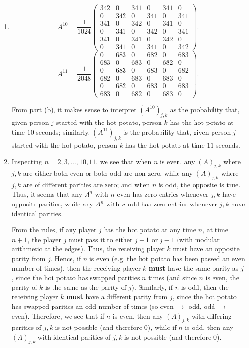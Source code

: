 \documentclass{homework}
\begin{document}
\begin{solution}
\begin{enumerate}[label=(\alph*)]
    \item \[
        A^{10}=\frac{1}{1024}\begin{pmatrix} 342&0&341&0&341&0 \\ 0&342&0&341&0&341 \\
        341&0&342&0&341&0 \\ 0&341&0&342&0&341 \\ 341&0&341&0&342&0 \\ 0&341&0&341&0&342 \end{pmatrix} 
    .\] 
    \[
      A^{11}=\frac{1}{2048}\begin{pmatrix} 0&683&0&682&0&683 \\ 683&0&683&0&682&0 \\ 0&683&0&683&0&682 \\
      682&0&683&0&683&0 \\ 0&682&0&683&0&683 \\ 683&0&682&0&683&0\end{pmatrix} 
    .\] 

    From part (b), it makes sense to interpret $(A^{10})_{j,k}$ as the probability that, given
    person $j$ started with the hot potato, person $k$ has the hot potato at time $10$ seconds;
    similarly, $(A^{11})_{j,k}$ is the probability that, given person $j$ started with the hot
    potato, person $k$ has the hot potato at time $11$ seconds.

    \item Inspecting $n=2,3,\ldots,10,11$, we see that when $n$ is even, any $(A)_{j,k}$ where $j,k$ 
      are either both even or both odd are non-zero, while any $(A)_{j,k}$ where $j,k$ are of
      different parities are zero; and when $n$ is odd, the opposite is true. Thus, it seems that
      any $A^{n}$ with $n$ even has zero entries whenever $j,k$ have opposite parities, while any
      $A^n$ with $n$ odd has zero entries whenever $j,k$ have identical parities.

      From the rules, if any player $j$ has the hot potato at any time $n$, at time $n+1$, the
      player $j$ must pass it to either $j+1$ or $j-1$ (with modular arithmetic at the edges). Thus,
      the receiving player $k$ must have an opposite parity from $j$. Hence, if $n$ is even (e.g.
      the hot potato has been passed an even number of times), then the receiving player $k$ 
      \textbf{must} have the same parity as $j$, since the hot potato has swapped parities $n$ times
      (and since $n$ is even, the parity of $k$ is the same as the parity of $j$). Similarly, if
      $n$ is odd, then the receiving player $k$ \textbf{must} have a different parity from $j$,
      since the hot potato has swapped parities an odd number of times (so even $\to$ odd, odd $\to$
      even). Therefore, we see that if $n$ is even, then any $(A)_{j,k}$ with differing parities of
      $j,k$ is not possible (and therefore $0$), while if $n$ is odd, then any $(A)_{j,k}$ with
      identical parities of $j,k$ is not possible (and therefore $0$).
  \end{enumerate}
\end{solution}
\end{document}
